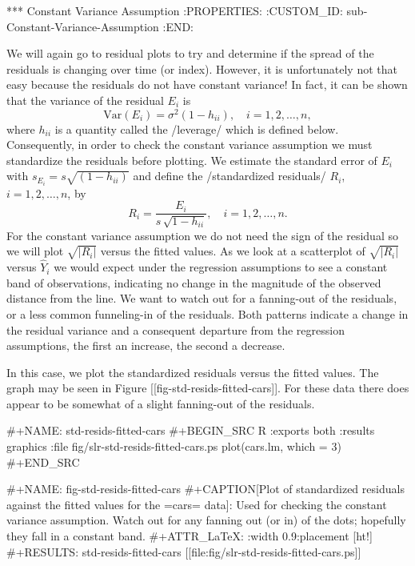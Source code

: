 *** Constant Variance Assumption
:PROPERTIES:
:CUSTOM_ID: sub-Constant-Variance-Assumption
:END:

We will again go to residual plots to try and determine if the spread
of the residuals is changing over time (or index). However, it is
unfortunately not that easy because the residuals do not have constant
variance! In fact, it can be shown that the variance of the residual
\(E_{i}\) is
\begin{equation}
\mbox{Var$(E_{i})$}=\sigma^{2}(1-h_{ii}),\quad i=1,2,\ldots,n,
\end{equation}
where \(h_{ii}\) is a quantity called the /leverage/ which is defined
below. Consequently, in order to check the constant variance
assumption we must standardize the residuals before plotting. We
estimate the standard error of \(E_{i}\) with
\(s_{E_{i}}=s\sqrt{(1-h_{ii})}\) and define the /standardized
residuals/ \(R_{i}\), \(i=1,2,\ldots,n\), by
\begin{equation} 
R_{i}=\frac{E_{i}}{s\,\sqrt{1-h_{ii}}},\quad i=1,2,\ldots,n.
\end{equation}
For the constant variance assumption we do not need the sign of the
residual so we will plot \(\sqrt{|R_{i}|}\) versus the fitted
values. As we look at a scatterplot of \(\sqrt{|R_{i}|}\) versus
\(\hat{Y}_{i}\) we would expect under the regression assumptions to
see a constant band of observations, indicating no change in the
magnitude of the observed distance from the line. We want to watch out
for a fanning-out of the residuals, or a less common funneling-in of
the residuals. Both patterns indicate a change in the residual
variance and a consequent departure from the regression assumptions,
the first an increase, the second a decrease.

In this case, we plot the standardized residuals versus the fitted
values. The graph may be seen in Figure [[fig-std-resids-fitted-cars]]. For
these data there does appear to be somewhat of a slight fanning-out of
the residuals.

#+NAME: std-resids-fitted-cars
#+BEGIN_SRC R :exports both :results graphics :file fig/slr-std-resids-fitted-cars.ps
plot(cars.lm, which = 3)
#+END_SRC

#+NAME: fig-std-resids-fitted-cars
#+CAPTION[Plot of standardized residuals against the fitted values for the =cars= data]: \small Used for checking the constant variance assumption. Watch out for any fanning out (or in) of the dots; hopefully they fall in a constant band.
#+ATTR_LaTeX: :width 0.9\textwidth :placement [ht!]
#+RESULTS: std-resids-fitted-cars
[[file:fig/slr-std-resids-fitted-cars.ps]]

